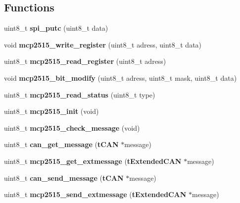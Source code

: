 \subsection*{\-Functions}
\begin{DoxyCompactItemize}
\item 
uint8\-\_\-t {\bfseries spi\-\_\-putc} (uint8\-\_\-t data)\label{group__can_gac4133801d9adaaf42e7a43018c159127}

\item 
void {\bfseries mcp2515\-\_\-write\-\_\-register} (uint8\-\_\-t adress, uint8\-\_\-t data)\label{group__can_gaf18f4716d0060c65756daf517d339968}

\item 
uint8\-\_\-t {\bfseries mcp2515\-\_\-read\-\_\-register} (uint8\-\_\-t adress)\label{group__can_ga9f78b3c42a3e8039350f2332aacef2b9}

\item 
void {\bfseries mcp2515\-\_\-bit\-\_\-modify} (uint8\-\_\-t adress, uint8\-\_\-t mask, uint8\-\_\-t data)\label{group__can_ga29ca95ce06b46820080e6bf39aca3f5d}

\item 
uint8\-\_\-t {\bfseries mcp2515\-\_\-read\-\_\-status} (uint8\-\_\-t type)\label{group__can_gab3e48a42131e0f03105ed354041bbdba}

\item 
uint8\-\_\-t {\bfseries mcp2515\-\_\-init} (void)\label{group__can_ga7be3d201a4dda59f8a16898c935c2b39}

\item 
uint8\-\_\-t {\bfseries mcp2515\-\_\-check\-\_\-message} (void)\label{group__can_gac2e0bfcf7677115090c357ff1cef0fa2}

\item 
uint8\-\_\-t {\bfseries can\-\_\-get\-\_\-message} ({\bf t\-C\-A\-N} $\ast$message)\label{group__can_ga0926474bc6315f1d7d9d81492629e6ca}

\item 
uint8\-\_\-t {\bfseries mcp2515\-\_\-get\-\_\-extmessage} ({\bf t\-Extended\-C\-A\-N} $\ast$message)\label{group__can_ga8119e51b53388c64e3bdd771bd9ab642}

\item 
uint8\-\_\-t {\bfseries can\-\_\-send\-\_\-message} ({\bf t\-C\-A\-N} $\ast$message)\label{group__can_gac0bc127d4f90b38d86aa09297379697b}

\item 
uint8\-\_\-t {\bfseries mcp2515\-\_\-send\-\_\-extmessage} ({\bf t\-Extended\-C\-A\-N} $\ast$message)\label{group__can_ga3efadd966e76741e5e8f711e9bc7ed9d}


\end{DoxyCompactItemize}
